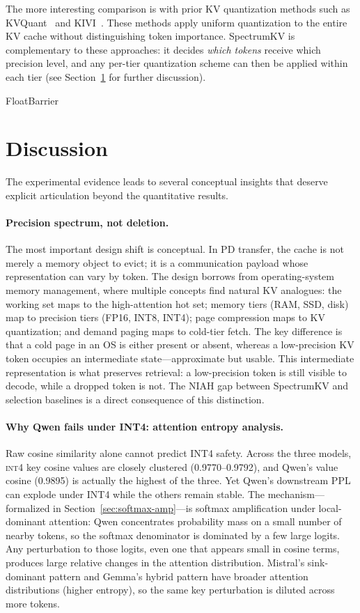 \documentclass[11pt]{article}
\newcommand{\method}{SpectrumKV}
\newcommand{\niah}{NIAH}
\newcommand{\intiv}{\textsc{int4}}
\theoremstyle{plain}
\theoremstyle{definition}
\begin{document}
The more interesting comparison is with prior KV quantization methods such as KVQuant~\citep{kvquant} and KIVI~\citep{kivi}.  These methods apply uniform quantization to the entire KV cache without distinguishing token importance.  \method{} is complementary to these approaches: it decides \emph{which tokens} receive which precision level, and any per-tier quantization scheme can then be applied within each tier (see Section~\ref{sec:discussion} for further discussion).

FloatBarrier
\section{Discussion}
\label{sec:discussion}

The experimental evidence leads to several conceptual insights that deserve explicit articulation beyond the quantitative results.

\paragraph{Precision spectrum, not deletion.}
The most important design shift is conceptual.  In PD transfer, the cache is not merely a memory object to evict; it is a communication payload whose representation can vary by token.  The design borrows from operating-system memory management, where multiple concepts find natural KV analogues: the working set maps to the high-attention hot set; memory tiers (RAM, SSD, disk) map to precision tiers (FP16, INT8, INT4); page compression maps to KV quantization; and demand paging maps to cold-tier fetch.  The key difference is that a cold page in an OS is either present or absent, whereas a low-precision KV token occupies an intermediate state---approximate but usable.  This intermediate representation is what preserves retrieval: a low-precision token is still visible to decode, while a dropped token is not.  The \niah{} gap between \method{} and selection baselines is a direct consequence of this distinction.

\paragraph{Why Qwen fails under INT4: attention entropy analysis.}
Raw cosine similarity alone cannot predict INT4 safety.  Across the three models, \intiv{} key cosine values are closely clustered (0.9770--0.9792), and Qwen's value cosine (0.9895) is actually the highest of the three.  Yet Qwen's downstream PPL can explode under INT4 while the others remain stable.  The mechanism---formalized in Section~\ref{sec:softmax-amp}---is softmax amplification under local-dominant attention: Qwen concentrates probability mass on a small number of nearby tokens, so the softmax denominator is dominated by a few large logits.  Any perturbation to those logits, even one that appears small in cosine terms, produces large relative changes in the attention distribution.  Mistral's sink-dominant pattern and Gemma's hybrid pattern have broader attention distributions (higher entropy), so the same key perturbation is diluted across more tokens.
\end{document}
